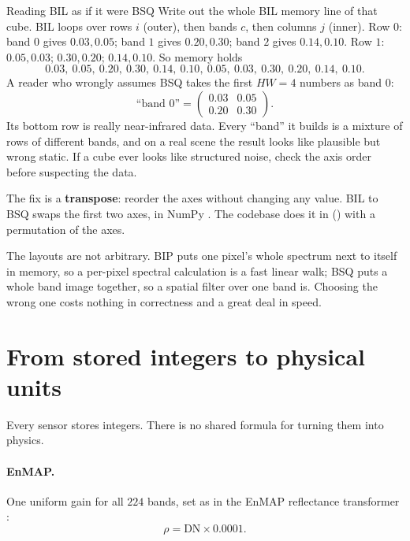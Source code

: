 \begin{worked}[label={we:sensors:misread}]{Reading BIL as if it were BSQ}
Write out the whole BIL memory line of that cube. BIL loops over rows $i$ (outer), then bands $c$,
then columns $j$ (inner). Row $0$: band $0$ gives $0.03, 0.05$; band $1$ gives $0.20, 0.30$;
band $2$ gives $0.14, 0.10$. Row $1$: $0.05, 0.03$; $0.30, 0.20$; $0.14, 0.10$. So memory holds
\[ 0.03,\ 0.05,\ 0.20,\ 0.30,\ 0.14,\ 0.10,\ 0.05,\ 0.03,\ 0.30,\ 0.20,\ 0.14,\ 0.10. \]
A reader who wrongly assumes BSQ takes the first $HW = 4$ numbers as band $0$:
\[ \text{``band 0''} = \begin{pmatrix} 0.03 & 0.05\\ 0.20 & 0.30\end{pmatrix}. \]
Its bottom row is really near-infrared data. Every ``band'' it builds is a mixture of rows of
different bands, and on a real scene the result looks like plausible but wrong static. If a cube
ever looks like structured noise, check the axis order before suspecting the data.
\end{worked}

The fix is a \textbf{transpose}: reorder the axes without changing any
value. BIL  to BSQ  swaps the first two axes, in NumPy
. The codebase does it in
() with a permutation of the axes.

The layouts are not arbitrary. BIP puts one pixel's whole spectrum next to itself in memory, so a
per-pixel spectral calculation is a fast linear walk; BSQ puts a whole band image together, so a
spatial filter over one band is. Choosing the wrong one costs nothing in correctness and a great
deal in speed.

\section{From stored integers to physical units}\label{sec:sensors:calibration}

Every sensor stores integers. There is no shared formula for turning them into physics.

\paragraph{EnMAP.} One uniform gain for all $224$ bands, set as  in
the EnMAP reflectance transformer
:
\begin{equation}\label{eq:sensors:enmap}
\rho = \mathrm{DN} \times 0.0001.
\end{equation}


